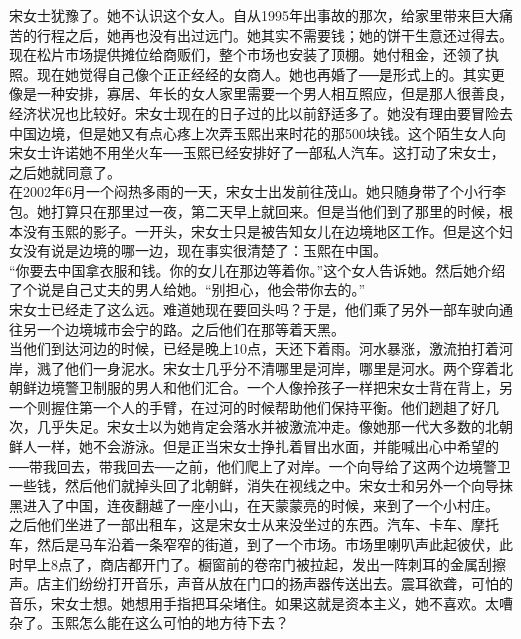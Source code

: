 \begin{multicols}{\theparacolNo}
宋女士犹豫了。她不认识这个女人。自从1995年出事故的那次，给家里带来巨大痛苦的行程之后，她再也没有出过远门。她其实不需要钱；她的饼干生意还过得去。现在松片市场提供摊位给商贩们，整个市场也安装了顶棚。她付租金，还领了执照。现在她觉得自己像个正正经经的女商人。她也再婚了──是形式上的。其实更像是一种安排，寡居、年长的女人家里需要一个男人相互照应，但是那人很善良，经济状况也比较好。宋女士现在的日子过的比以前舒适多了。她没有理由要冒险去中国边境，但是她又有点心疼上次弄玉熙出来时花的那500块钱。这个陌生女人向宋女士许诺她不用坐火车──玉熙已经安排好了一部私人汽车。这打动了宋女士，之后她就同意了。\\

在2002年6月一个闷热多雨的一天，宋女士出发前往茂山。她只随身带了个小行李包。她打算只在那里过一夜，第二天早上就回来。但是当他们到了那里的时候，根本没有玉熙的影子。一开头，宋女士只是被告知女儿在边境地区工作。但是这个妇女没有说是边境的哪一边，现在事实很清楚了：玉熙在中国。\\

“你要去中国拿衣服和钱。你的女儿在那边等着你。”这个女人告诉她。然后她介绍了个说是自己丈夫的男人给她。“别担心，他会带你去的。”\\

宋女士已经走了这么远。难道她现在要回头吗？于是，他们乘了另外一部车驶向通往另一个边境城市会宁的路。之后他们在那等着天黑。\\

当他们到达河边的时候，已经是晚上10点，天还下着雨。河水暴涨，激流拍打着河岸，溅了他们一身泥水。宋女士几乎分不清哪里是河岸，哪里是河水。两个穿着北朝鲜边境警卫制服的男人和他们汇合。一个人像拎孩子一样把宋女士背在背上，另一个则握住第一个人的手臂，在过河的时候帮助他们保持平衡。他们趔趄了好几次，几乎失足。宋女士以为她肯定会落水并被激流冲走。像她那一代大多数的北朝鲜人一样，她不会游泳。但是正当宋女士挣扎着冒出水面，并能喊出心中希望的──带我回去，带我回去──之前，他们爬上了对岸。一个向导给了这两个边境警卫一些钱，然后他们就掉头回了北朝鲜，消失在视线之中。宋女士和另外一个向导抹黑进入了中国，连夜翻越了一座小山，在天蒙蒙亮的时候，来到了一个小村庄。\\

之后他们坐进了一部出租车，这是宋女士从来没坐过的东西。汽车、卡车、摩托车，然后是马车沿着一条窄窄的街道，到了一个市场。市场里喇叭声此起彼伏，此时早上8点了，商店都开门了。橱窗前的卷帘门被拉起，发出一阵刺耳的金属刮擦声。店主们纷纷打开音乐，声音从放在门口的扬声器传送出去。震耳欲聋，可怕的音乐，宋女士想。她想用手指把耳朵堵住。如果这就是资本主义，她不喜欢。太嘈杂了。玉熙怎么能在这么可怕的地方待下去？\\


\end{multicols}

